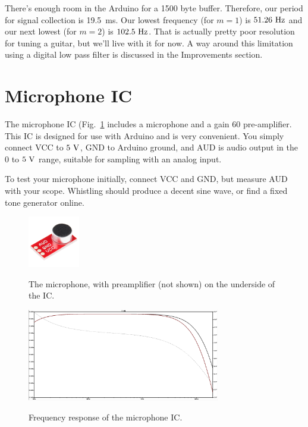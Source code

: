 \documentclass[12pt]{article}
\begin{document}
There's enough room in the Arduino for a 1500 byte buffer.  Therefore, our period for signal collection is 
{19.5~\rm ms}.  Our lowest frequency (for $m=1$) is $51.26~\rm Hz$ and our next lowest (for $m=2$) is $102.5~\rm Hz$.   That is actually pretty poor resolution for tuning a guitar, but we'll live with it for now.  A way around this limitation using a digital low pass filter is discussed in the Improvements section.

\section{Microphone IC}

The microphone IC (Fig.~\ref{fig:mic} includes a microphone and a gain 60 pre-amplifier.  This IC is designed for use with Arduino and is very convenient.  You simply connect VCC to $5~\rm V$, GND to Arduino ground, and AUD is audio output in the $0$ to $5~\rm V$ range, suitable for sampling with an analog input.

To test your microphone initially, connect VCC and GND, but measure AUD with your scope.  Whistling should produce a decent sine wave, or find a fixed tone generator online.

\begin{figure}[htbp]
\begin{center}
{\includegraphics[width=0.20\textwidth]{figs/mic.jpg}}
\end{center}
\caption{\label{fig:mic} The microphone, with preamplifier (not shown) on the underside of the IC.}
\end{figure}

\begin{figure}[htbp]
\begin{center}
{\includegraphics[width=0.75\textwidth]{figs/freq.png}}
\end{center}
\caption{\label{fig:freq} Frequency response of the microphone IC.}
\end{figure}
\end{document}
